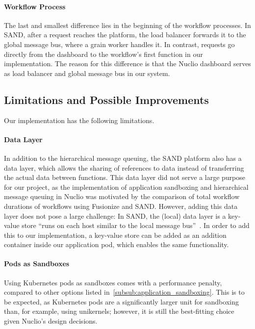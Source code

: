\paragraph{Workflow Process}

The last and smallest difference lies in the beginning of the workflow processes. 
In SAND, after a request reaches the platform, the load balancer forwards it to the global message bus, where a grain worker handles it.
In contrast, requests go directly from the dashboard to the workflow's first function in our implementation.
The reason for this difference is that the Nuclio dashboard serves as load balancer and global message bus in our system.

\subsection{Limitations and Possible Improvements}

Our implementation has the following limitations.

\paragraph{Data Layer}

In addition to the hierarchical message queuing, the SAND platform also has a data layer, which allows the sharing of references to data instead of transferring the actual data between functions.
This data layer did not serve a large purpose for our project, as the implementation of application sandboxing and hierarchical message queuing in Nuclio was motivated by the comparison of total workflow durations of workflows using Fusionize and SAND.
However, adding this data layer does not pose a large challenge: In SAND, the (local) data layer is a key-value store \enquote{runs on each host similar to the local message bus}~\cite{akkus2018sand}.
In order to add this to our implementation, a key-value store can be added as an addition container inside our application pod, which enables the same functionality. 

\paragraph{Pods as Sandboxes}

Using Kubernetes pods as sandboxes comes with a performance penalty, compared to other options listed in~\ref{subsub:application_sandboxing}.
This is to be expected, as Kubernetes pods are a significantly larger unit for sandboxing than, for example, using unikernels; however, it is still the best-fitting choice given Nuclio's design decisions.

